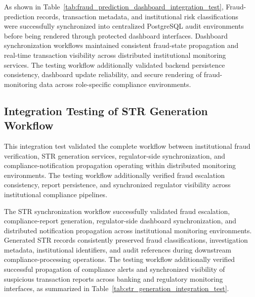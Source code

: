 \renewcommand{\arraystretch}{1}

As shown in Table~\ref{tab:fraud_prediction_dashboard_integration_test}, Fraud-prediction records, transaction metadata, and institutional risk classifications were successfully synchronized into centralized PostgreSQL audit environments before being rendered through protected dashboard interfaces. Dashboard synchronization workflows maintained consistent fraud-state propagation and real-time transaction visibility across distributed institutional monitoring services. The testing workflow additionally validated backend persistence consistency, dashboard update reliability, and secure rendering of fraud-monitoring data across role-specific compliance environments.

\subsection[Integration Testing of STR Generation Workflow]{\textbf{Integration Testing of STR Generation Workflow}}

This integration test validated the complete workflow between institutional fraud verification, STR generation services, regulator-side synchronization, and compliance-notification propagation operating within distributed monitoring environments. The testing workflow additionally verified fraud escalation consistency, report persistence, and synchronized regulator visibility across institutional compliance pipelines.

The STR synchronization workflow successfully validated fraud escalation, compliance-report generation, regulator-side dashboard synchronization, and distributed notification propagation across institutional monitoring environments. Generated STR records consistently preserved fraud classifications, investigation metadata, institutional identifiers, and audit references during downstream compliance-processing operations. The testing workflow additionally verified successful propagation of compliance alerts and synchronized visibility of suspicious transaction reports across banking and regulatory monitoring interfaces, as summarized in Table~\ref{tab:str_generation_integration_test}.
\renewcommand{\arraystretch}{1.3}

